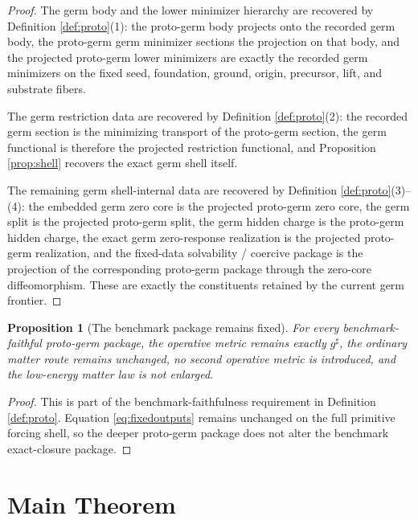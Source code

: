 \documentclass[11pt]{article}
\newcommand{\CompletedMetric}{g^{\sharp}}
\newtheorem{proposition}{Proposition}
\begin{document}
\begin{proof}
The germ body and the lower minimizer hierarchy are recovered by Definition \ref{def:proto}(1): the proto-germ body projects onto the recorded germ body, the proto-germ germ minimizer sections the projection on that body, and the projected proto-germ lower minimizers are exactly the recorded germ minimizers on the fixed seed, foundation, ground, origin, precursor, lift, and substrate fibers.

The germ restriction data are recovered by Definition \ref{def:proto}(2): the recorded germ section is the minimizing transport of the proto-germ section, the germ functional is therefore the projected restriction functional, and Proposition \ref{prop:shell} recovers the exact germ shell itself.

The remaining germ shell-internal data are recovered by Definition \ref{def:proto}(3)--(4): the embedded germ zero core is the projected proto-germ zero core, the germ split is the projected proto-germ split, the germ hidden charge is the proto-germ hidden charge, the exact germ zero-response realization is the projected proto-germ realization, and the fixed-data solvability / coercive package is the projection of the corresponding proto-germ package through the zero-core diffeomorphism. These are exactly the constituents retained by the current germ frontier.
\end{proof}

\begin{proposition}[The benchmark package remains fixed]
\label{prop:boundary}
For every benchmark-faithful proto-germ package, the operative metric remains exactly \(\CompletedMetric\), the ordinary matter route remains unchanged, no second operative metric is introduced, and the low-energy matter law is not enlarged.
\end{proposition}

\begin{proof}
This is part of the benchmark-faithfulness requirement in Definition \ref{def:proto}. Equation \eqref{eq:fixedoutputs} remains unchanged on the full primitive forcing shell, so the deeper proto-germ package does not alter the benchmark exact-closure package.
\end{proof}

\section{Main Theorem}
\end{document}
